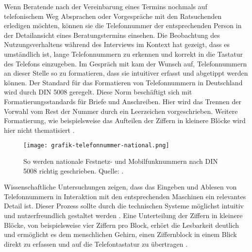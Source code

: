 Wenn Beratende nach der Vereinbarung eines Termins nochmals auf telefonischem
Weg Absprachen oder Vorgespräche mit den Ratsuchenden erledigen möchten, können
sie die Telefonnummer der entsprechenden Person in der Detailansicht eines
Beratungstermins einsehen. Die Beobachtung des Nutzungsverhaltens während des
Interviews im Kontext hat gezeigt, dass es umständlich ist, lange
Telefonnummern zu erkennen und korrekt in die Tastatur des Telefons einzugeben.
Im Gespräch mit \ipName kam der Wunsch auf, Telefonnummern an dieser Stelle so
zu formatieren, dass sie intuitiver erfasst und abgetippt werden können. Der
Standard für das Formatieren von Telefonnummern in Deutschland wird durch DIN
5008 geregelt. Diese Norm beschäftigt sich mit Formatierungsstandards für
Briefe und Anschreiben. Hier wird das Trennen der Vorwahl vom Rest der Nummer
durch ein Leerzeichen vorgeschrieben. Weitere Formatierung, wie beispielsweise
das Aufteilen der Ziffern in kleinere Blöcke wird hier nicht
thematisiert \cite{din5008}.

\begin{figure}[H]
    \caption{So werden nationale Festnetz- und Mobilfunknummern nach DIN 5008 richtig geschrieben. Quelle:  \cite{phoneFormatBlog}.}
    \centering
    \texttt{[image: grafik-telefonnummer-national.png]}
\end{figure}

Wissenschaftliche Untersuchungen zeigen, dass das Eingeben und Ablesen von
Telefonnummern in Interaktion mit den entsprechenden Maschinen ein relevantes
Detail ist. Dieser Prozess sollte durch die technischen Systeme möglichst
intuitiv und nutzerfreundlich gestaltet werden \cite{humCompPhoneNumbers}. Eine
Unterteilung der Ziffern in kleinere Blöcke, von beispielsweise vier Ziffern
pro Block, erhört die Lesbarkeit deutlich und ermöglicht es dem menschlichen
Gehirn, einen Ziffernblock in einem Blick direkt zu erfassen und auf die
Telefontastatur zu
übertragen \cite{phoneFormatBlog} \cite{numberRecognition} \cite{numberRepres}.
